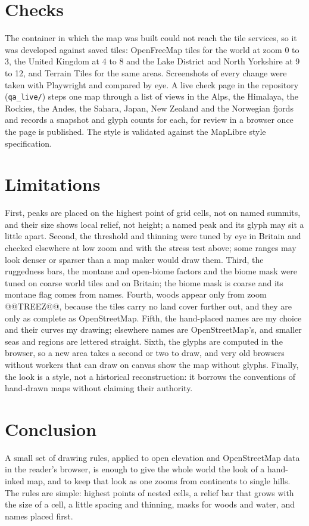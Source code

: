 \documentclass[11pt,a4paper]{article}
\begin{document}
\section{Checks}
The container in which the map was built could not reach the tile services, so it was developed against saved tiles: OpenFreeMap tiles for the world at zoom 0 to 3, the United Kingdom at 4 to 8 and the Lake District and North Yorkshire at 9 to 12, and Terrain Tiles for the same areas. Screenshots of every change were taken with Playwright and compared by eye. A live check page in the repository (\texttt{qa\_live/}) steps one map through a list of views in the Alps, the Himalaya, the Rockies, the Andes, the Sahara, Japan, New Zealand and the Norwegian fjords and records a snapshot and glyph counts for each, for review in a browser once the page is published. The style is validated against the MapLibre style specification.

\section{Limitations}
First, peaks are placed on the highest point of grid cells, not on named summits, and their size shows local relief, not height; a named peak and its glyph may sit a little apart. Second, the threshold and thinning were tuned by eye in Britain and checked elsewhere at low zoom and with the stress test above; some ranges may look denser or sparser than a map maker would draw them. Third, the ruggedness bars, the montane and open-biome factors and the biome mask were tuned on coarse world tiles and on Britain; the biome mask is coarse and its montane flag comes from names. Fourth, woods appear only from zoom @@TREEZ@@, because the tiles carry no land cover further out, and they are only as complete as OpenStreetMap. Fifth, the hand-placed names are my choice and their curves my drawing; elsewhere names are OpenStreetMap's, and smaller seas and regions are lettered straight. Sixth, the glyphs are computed in the browser, so a new area takes a second or two to draw, and very old browsers without workers that can draw on canvas show the map without glyphs. Finally, the look is a style, not a historical reconstruction: it borrows the conventions of hand-drawn maps without claiming their authority.

\section{Conclusion}
A small set of drawing rules, applied to open elevation and OpenStreetMap data in the reader's browser, is enough to give the whole world the look of a hand-inked map, and to keep that look as one zooms from continents to single hills. The rules are simple: highest points of nested cells, a relief bar that grows with the size of a cell, a little spacing and thinning, masks for woods and water, and names placed first.
\end{document}
